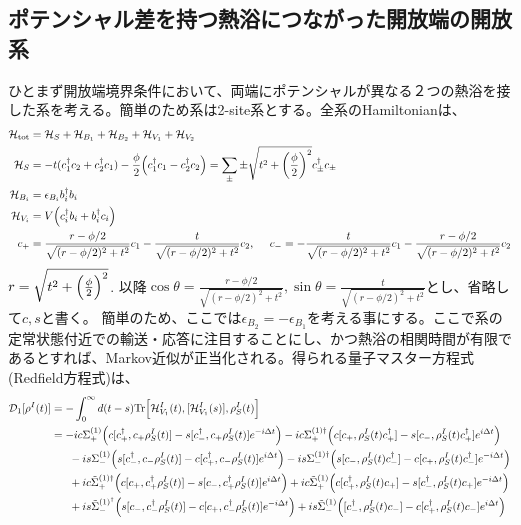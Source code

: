 \documentclass[dvipdfmx,autodetect-engine]{jsarticle}
\newcommand{\da}{\dagger}
\newcommand{\m}[1]{\mathcal{#1}}
\newcommand{\mr}[1]{\mathrm{#1}}
\newcommand{\ttr}[1]{\mathrm{Tr}\Bigl[#1\Bigr]}
\begin{document}
\subsection{ポテンシャル差を持つ熱浴につながった開放端の開放系}
ひとまず開放端境界条件において、両端にポテンシャルが異なる２つの熱浴を接した系を考える。簡単のため系は2-site系とする。全系のHamiltonianは、
\begin{align}
    \m{H}_{\mr{tot}} &= \m{H}_{S} + \m{H}_{B_1} + \m{H}_{B_2} + \m{H}_{V_1} + \m{H}_{V_2}\\
    \m{H}_S &= -t(c^\da_1c_2 + c^\da_2c_1) - \frac{\phi}{2}\qty( c^\da_1c_1 - c^\da_2c_2) = \sum_{\pm}\pm\sqrt{t^2+\qty(\frac{\phi}{2})^2}c^\da_{\pm}c_\pm\\
    \m{H}_{B_i} &= \epsilon_{B_i} b^\da_ib_i\\
    \m{H}_{V_i} &= V \qty(c^\da_i b_i + b^\da_ic_i)\\
    c_{+} &= \frac{r-\phi/2}{\sqrt{(r-\phi/2)^2+t^2}}c_1 - \frac{t}{\sqrt{(r-\phi/2)^2+t^2}}c_2, \ \ \ \  c_{-} = -\frac{t}{\sqrt{(r-\phi/2)^2+t^2}}c_1 - \frac{r-\phi/2}{\sqrt{(r-\phi/2)^2+t^2}}c_2
\end{align}
$r = \sqrt{t^2+\qty(\frac{\phi}{2})^2}$. 以降$\cos\theta = \frac{r-\phi/2}{\sqrt{(r-\phi/2)^2+t^2}}, \sin\theta=\frac{t}{\sqrt{(r-\phi/2)^2+t^2}}$とし、省略して$c, s$と書く。 簡単のため、ここでは$\epsilon_{B_2} = -\epsilon_{B_1}$を考える事にする。ここで系の定常状態付近での輸送・応答に注目することにし、かつ熱浴の相関時間が有限であるとすれば、Markov近似が正当化される。得られる量子マスター方程式(Redfield方程式)は、
\begin{align}
    \m{D}_1[\rho^I(t)] &= -\int_0^\infty d(t-s) \ttr{\m{H}_{V_1}^I(t), [\m{H}_{V_1}^I(s)], \rho^I_S(t)}\\
    &= -i c\Sigma^{(1)}_+\qty(c[c_+^\da, c_+\rho_S^I(t)] -s[c_-^\da, c_+\rho_S^I(t)]e^{-i\Delta t}) -i c\Sigma^{(1)\da}_+\qty(c[c_+, \rho_S^I(t)c_+^\da] -s [c_-, \rho_S^I(t)c_+^\da]e^{i\Delta t})\nonumber\\
    & \ \ \ \ \ -i s\Sigma^{(1)}_-\qty(s[c_-^\da, c_-\rho_S^I(t)] -c [c_+^\da, c_-\rho_S^I(t)]e^{i\Delta t})  -i s\Sigma^{(1)\da}_-\qty(s[c_-, \rho_S^I(t)c_-^\da] -c [c_+, \rho_S^I(t)c_-^\da]e^{-i\Delta t})\nonumber\\
    & \ \ \ \ \ +i c\tilde{\Sigma}^{(1)\da}_+\qty(c[c_+, c_+^\da\rho_S^I(t)] -s [c_-, c_+^\da\rho_S^I(t)]e^{i\Delta t}) +i c\tilde{\Sigma}^{(1)}_+\qty(c[c_+^\da, \rho_S^I(t)c_+] -s [c_-^\da, \rho_S^I(t)c_+]e^{-i\Delta t})\nonumber\\
    & \ \ \ \ \ +i s\tilde{\Sigma}^{(1)^\da}_-\qty(s[c_-, c_-^\da\rho_S^I(t)] -c [c_+, c_-^\da\rho_S^I(t)]e^{-i\Delta t}) +i s\tilde{\Sigma}^{(1)}_-\qty([c_-^\da, \rho_S^I(t)c_-] -c [c_+^\da, \rho_S^I(t)c_-]e^{i\Delta t})
\end{align}
\end{document}
